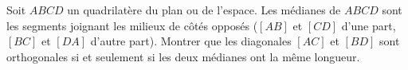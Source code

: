 Soit $ABCD$ un quadrilatère du plan ou de l'espace. Les médianes de $ABCD$
sont les segments joignant les milieux de côtés opposés ($[AB]$ et $[CD]$
d'une part, $[BC]$ et $[DA]$ d'autre part). Montrer que les diagonales $[AC]$
et $[BD]$ sont orthogonales si et seulement si les deux médianes ont la même
longueur.
